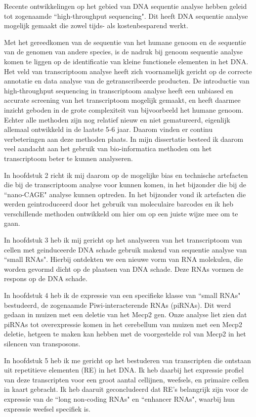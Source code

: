 Recente ontwikkelingen op het gebied van DNA sequentie analyse hebben geleid tot zogenaamde ``high-throughput sequencing". Dit heeft DNA sequentie analyse mogelijk gemaakt die zowel tijds- als kostenbesparend werkt.

Met het gereedkomen van de sequentie van het humane genoom en de sequentie van de genomen van andere species, is de nadruk bij genoom sequentie analyse komen te liggen op de identificatie van kleine functionele elementen in het DNA.  Het veld van transcriptoom analyse heeft zich voornamelijk gericht op de correcte annotatie en data analyse van de getranscribeerde producten. De introductie van high-throughput sequencing in transcriptoom analyse heeft een unbiased en accurate screening van het transcriptoom mogelijk gemaakt, en heeft daarmee inzicht geboden in de grote complexiteit van bijvoorbeeld het humane genoom. Echter alle methoden zijn nog relatief nieuw en niet gematureerd, eigenlijk allemaal ontwikkeld in de laatste 5-6 jaar. Daarom vinden er continu verbeteringen aan deze methoden plaats. In mijn dissertatie besteed ik daarom veel aandacht aan het gebruik van bio-informatica methoden om het transcriptoom beter te kunnen analyseren.

In hoofdstuk 2 richt ik mij daarom op de mogelijke bias en technische artefacten  die bij de transcriptoom analyse voor kunnen komen, in het bijzonder die bij de ``nano-CAGE" analyse kunnen optreden. In het bijzonder vond ik artefacten die werden geintroduceerd door het gebruik van moleculaire barcodes en ik heb verschillende methoden ontwikkeld om hier om op een juiste wijze mee om te gaan.

In hoofdstuk 3 heb ik mij gericht op het analyseren van het transcriptoom van cellen met geinduceerde DNA schade gebruik makend van sequentie analyse van ``small RNAs". Hierbij ontdekten we een nieuwe vorm van RNA molekulen, die worden gevormd dicht op de plaatsen van DNA schade. Deze RNAs vormen de respons op de DNA schade.

In hoofdstuk 4 heb ik de expressie van een specifieke klasse van ``small RNAs" bestudeerd, de zogenaamde Piwi-interacterende RNAs (piRNAs). Dit werd gedaan in muizen met een deletie van het Mecp2 gen. Onze analyse liet zien dat piRNAs tot overexpressie komen in het cerebellum van muizen met een Mecp2 deletie, hetgeen te maken kan hebben met de voorgestelde rol van Mecp2 in het silencen van transposons.

In hoofdstuk 5 heb ik me gericht op het bestuderen van transcripten die ontstaan uit repetitieve elementen (RE) in het DNA. Ik heb daarbij het expressie profiel van deze transcripten voor een groot aantal cellijnen, weefsels, en primaire cellen in kaart gebracht. Ik heb daaruit geconcludeerd dat RE's belangrijk zijn voor de expressie van de ``long non-coding RNAs" en ``enhancer RNAs", waarbij hun expressie weefsel specifiek is.

